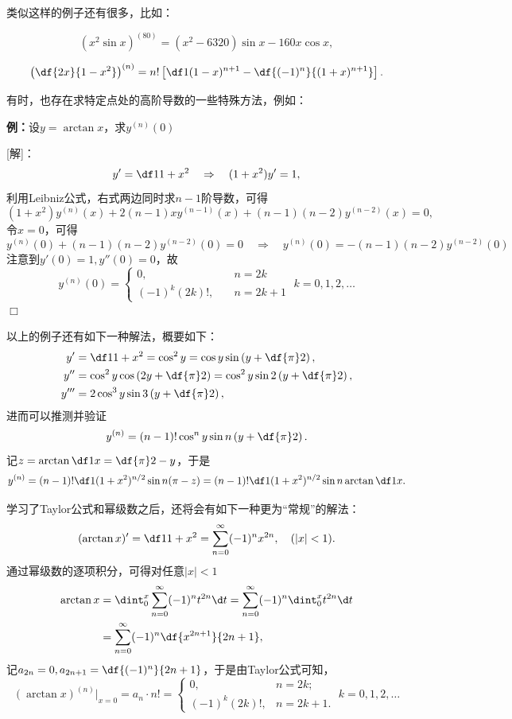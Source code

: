 类似这样的例子还有很多，比如：

$$(x^2\sin x)^{(80)}=(x^2-6320)\sin x-160x\cos x,$$

$$\left(\df{2x}{1-x^2}\right)^{(n)}=n!\left[\df1{(1-x)^{n+1}}
-\df{(-1)^n}{(1+x)^{n+1}}\right].$$

有时，也存在求特定点处的高阶导数的一些特殊方法，例如：

{\bf 例：}设$y=\arctan x$，求$y^{(n)}(0)$

[解]：
$$y'=\df1{1+x^2}\quad \Rightarrow\quad (1+x^2)y'=1,$$
利用Leibniz公式，右式两边同时求$n-1$阶导数，可得
$$(1+x^2)y^{(n)}(x)+2(n-1)xy^{(n-1)}(x)+(n-1)(n-2)y^{(n-2)}(x)=0,$$
令$x=0$，可得
$$y^{(n)}(0)+(n-1)(n-2)y^{(n-2)}(0)=0\quad
\Rightarrow\quad y^{(n)}(0)=-(n-1)(n-2)y^{(n-2)}(0)$$
注意到$y'(0)=1,y''(0)=0$，故
$$y^{(n)}(0)=\left\{\begin{array}{ll}
0,\quad& n=2k\\
(-1)^k(2k)!,\quad& n=2k+1
\end{array}\right.\;k=0,1,2,\ldots$$
\hfill$\Box$

\begin{shaded}
以上的例子还有如下一种解法，概要如下：
\begin{align*}
	y'&=\df1{1+x^2}=\cos^2y=\cos y\sin\left(y+\df{\pi}2\right),\\
	y''&=\cos^2y\cos\left(2y+\df{\pi}2\right)
	=\cos^2y\sin2\left(y+\df{\pi}2\right),\\
	y'''&=2\cos^3y\sin3\left(y+\df{\pi}2\right),
\end{align*}
进而可以推测并验证
$$y^{(n)}=(n-1)!\cos^ny\sin n\left(y+\df{\pi}2\right).$$
记$z=\arctan\df1x=\df{\pi}2-y$，于是
$$y^{(n)}=(n-1)!\df1{(1+x^2)^{n/2}}\sin n(\pi-z)=
(n-1)!\df1{(1+x^2)^{n/2}}\sin n\arctan\df1x.$$

学习了Taylor公式和幂级数之后，还将会有如下一种更为“常规”的解法：
$$(\arctan x)'=\df1{1+x^2}=\sum\limits_{n=0}^{\infty}(-1)^nx^{2n},
\quad (|x|<1).$$ 
通过幂级数的逐项积分，可得对任意$|x|<1$
\begin{align*}
	\arctan x&=\dint_0^x\sum\limits_{n=0}^{\infty}(-1)^nt^{2n}\d t
	=\sum\limits_{n=0}^{\infty}(-1)^n\dint_0^xt^{2n}\d t\\
	&=\sum\limits_{n=0}^{\infty}(-1)^n\df{x^{2n+1}}{2n+1},
\end{align*}
记$a_{2n}=0,a_{2n+1}=\df{(-1)^n}{2n+1}$，于是由Taylor公式可知，
$$(\arctan x)^{(n)}|_{x=0}=a_n\cdot n!
=\left\{\begin{array}{ll}
	0,& n=2k;\\ (-1)^k(2k)!, & n=2k+1.
\end{array}\right.\;k=0,1,2,\ldots$$
\end{shaded}

